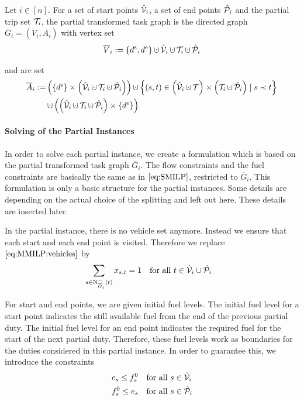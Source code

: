 \begin{definition}

Let $i\in[n]$. For a set of start points $\hat{\mathcal{V}}_i$, a set of end points $\hat{\mathcal{P}}_i$ and the partial trip set $\mathcal{T}_i$, the partial transformed task graph is the directed graph $\overline{G}_i=\left(\overline{V}_i,\overline{A}_i\right)$ with vertex set
\begin{align*}
	\overline{V}_i := \left\{\ds,\de\right\}\cupdot\Vhat_i\cupdot\Ti\cupdot\Phat_i
\end{align*}

and arc set
\begin{align*}
	\overline{A}_i := & \left(\left\{\ds\right\}\times\left(\Vhat_i\cupdot\Ti\cupdot\Phat_i\right)\right)\cupdot\left\{(s,t)\in\left(\Vhat_i\cupdot\mathcal{T}\right)\times\left(\Ti\cupdot\Phat_i\right)\mid s\prec t\right\} \\
	& \cupdot\left(\left(\Vhat_i\cupdot\Ti\cupdot\Phat_i\right)\times\left\{\de\right\}\right)
\end{align*}

\end{definition}

\paragraph{Solving of the Partial Instances} \parfill

In order to solve each partial instance, we create a formulation which is based on the partial transformed task graph $\overline{G}_i$. The flow constraints and the fuel constraints are basically the same as in $\eqref{eq:SMILP}$, restricted to $\overline{G}_i$. This formulation is only a basic structure for the partial instances. Some details are depending on the actual choice of the splitting and left out here. These details are inserted later.

In the partial instance, there is no vehicle set anymore. Instead we ensure that each start and each end point is visited. Therefore we replace $\eqref{eq:MMILP:vehicles}$ by
\begin{align}
	& \sum_{s\in\operatorname{N}_{\overline{G}_i}^-(t)} x_{s,t} = 1 && \text{for all } t\in\hat{\mathcal{V}}_i\cup\hat{\mathcal{P}}_i \label{eq:CMILP:start_end_points}
\end{align}

For start and end points, we are given initial fuel levels. The initial fuel level for a start point indicates the still available fuel from the end of the previous partial duty. The initial fuel level for an end point indicates the required fuel for the start of the next partial duty. Therefore, these fuel levels work as boundaries for the duties considered in this partial instance. In order to guarantee this, we introduce the constraints
\begin{align}
	& e_s \leq f^0_s && \text{for all } s\in\hat{\mathcal{V}}_i \label{eq:CMILP:initial_fuel} \\
	& f^0_s \leq e_s && \text{for all } s\in\hat{\mathcal{P}}_i \label{eq:CMILP:final_fuel}
\end{align}


